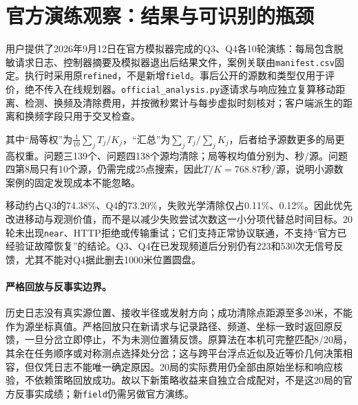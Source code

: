 \section{官方演练观察：结果与可识别的瓶颈}
\label{field:sec-official}
用户提供了2026年9月12日在官方模拟器完成的Q3、Q4各10轮演练：每局包含脱敏请求日志、控制器摘要及模拟器退出后结果文件，案例关联由\texttt{manifest.csv}固定。执行时采用原\texttt{refined}，不是新增\texttt{field}。事后公开的源数和类型仅用于评价，绝不传入在线规划器。\texttt{official\_analysis.py}逐请求与响应独立复算移动距离、检测、换频及清除费用，并按微秒累计与每步虚拟时刻核对；客户端派生的距离和换频字段只用于交叉检查。

\begin{table}[H]\centering\small
\caption{20轮官方演练的汇总；每题10轮均全清，时间单位秒/源}

\end{table}
其中“局等权”为$\frac1{10}\sum_j T_j/K_j$，“汇总”为$\sum_jT_j/\sum_jK_j$，后者给予源数更多的局更高权重。问题三139个、问题四138个源均清除；局等权均值分别为\OfficialQThreeMeanRun{}、\OfficialQFourMeanRun{}秒/源。问题四第8局只有10个源，仍需完成25点搜索，因此$T/K=768.87$秒/源，说明小源数案例的固定发现成本不能忽略。

\begin{table}[H]\centering\small
\caption{20轮官方演练逐局结果；$N$为退出后标签，不是正式测试分母}

\end{table}

移动约占Q3的74.38\%、Q4的73.20\%，失败光学清除仅占0.11\%、0.12\%。因此优先改进移动与观测价值，而不是以减少失败尝试次数这一小分项代替总时间目标。20轮未出现\texttt{near}、HTTP拒绝或传输重试；它们支持正常协议联通，不支持“官方已经验证故障恢复”的结论。Q3、Q4在已发现频道后分别仍有223和530次无信号反馈，尤其不能对Q4据此删去1000米位置圆盘。

\paragraph{严格回放与反事实边界。}
历史日志没有真实源位置、接收半径或发射方向；成功清除点距源至多20米，不能作为源坐标真值。严格回放只在新请求与记录路径、频道、坐标一致时返回原反馈，一旦分岔立即停止，不为未测位置猜反馈。原算法在本机可完整匹配8/20局，其余在任务顺序或对称测点选择处分岔；这与跨平台浮点近似及近等价几何决策相容，但仅凭日志不能唯一确定原因。20局的实际费用仍全部由原始坐标和响应核验，不依赖策略回放成功。故以下新策略收益来自独立合成配对，不是这20局的官方反事实成绩；新\texttt{field}仍需另做官方演练。
